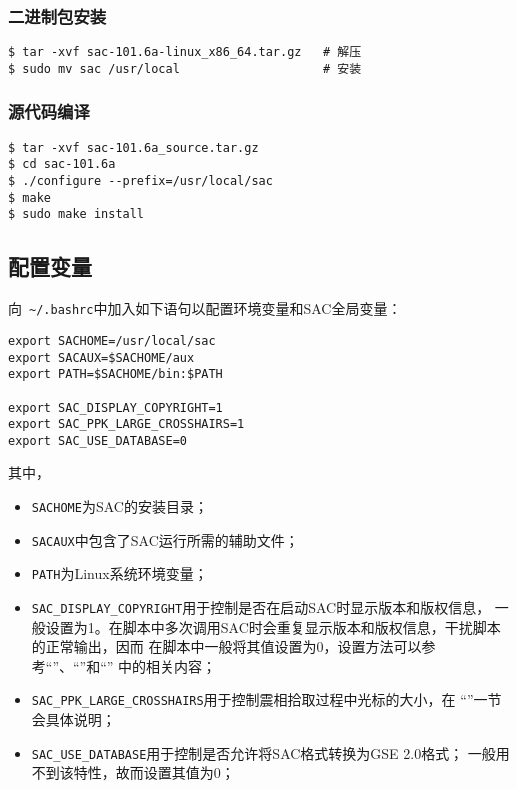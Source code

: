 \subsubsection*{二进制包安装}
\begin{verbatim}
$ tar -xvf sac-101.6a-linux_x86_64.tar.gz   # 解压
$ sudo mv sac /usr/local                    # 安装
\end{verbatim}

\subsubsection*{源代码编译}
\begin{verbatim}
$ tar -xvf sac-101.6a_source.tar.gz
$ cd sac-101.6a
$ ./configure --prefix=/usr/local/sac
$ make
$ sudo make install
\end{verbatim}

\subsection*{配置变量}
向~\verb+~/.bashrc+中加入如下语句以配置环境变量和SAC全局变量：
\begin{verbatim}
export SACHOME=/usr/local/sac
export SACAUX=$SACHOME/aux
export PATH=$SACHOME/bin:$PATH

export SAC_DISPLAY_COPYRIGHT=1
export SAC_PPK_LARGE_CROSSHAIRS=1
export SAC_USE_DATABASE=0
\end{verbatim}

其中，
\begin{itemize}
\item \verb+SACHOME+为SAC的安装目录；
\item \verb+SACAUX+中包含了SAC运行所需的辅助文件；
\item \verb+PATH+为Linux系统环境变量；
\item \verb+SAC_DISPLAY_COPYRIGHT+用于控制是否在启动SAC时显示版本和版权信息，
    一般设置为1。在脚本中多次调用SAC时会重复显示版本和版权信息，干扰脚本的正常输出，因而
    在脚本中一般将其值设置为0，设置方法可以参考``''、``''和``''
    中的相关内容；
\item \verb+SAC_PPK_LARGE_CROSSHAIRS+用于控制震相拾取过程中光标的大小，在
    ``''一节会具体说明；
\item \verb+SAC_USE_DATABASE+用于控制是否允许将SAC格式转换为GSE 2.0格式；
    一般用不到该特性，故而设置其值为0；
\end{itemize}

